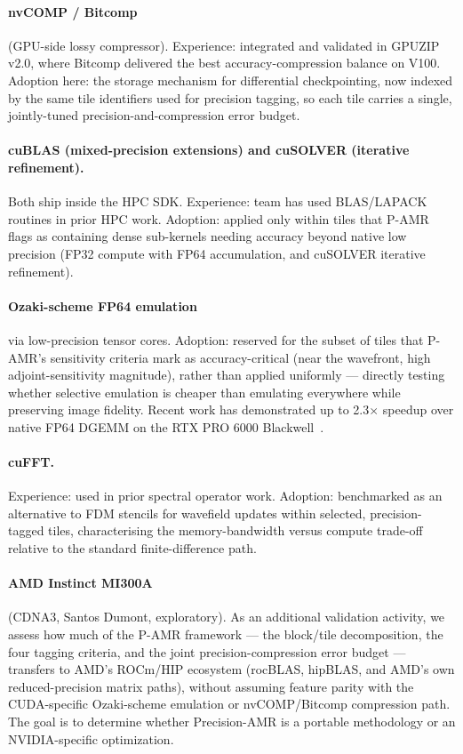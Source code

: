 \documentclass[12pt,a4paper]{article}
\newcommand{\pamr}{P\nobreakdash-AMR}
\begin{document}
\paragraph{nvCOMP / Bitcomp} (GPU-side lossy compressor). Experience: integrated
and validated in GPUZIP v2.0, where Bitcomp delivered the best
accuracy-compression balance on V100. Adoption here: the storage mechanism for
differential checkpointing, now indexed by the same tile identifiers used for
precision tagging, so each tile carries a single, jointly-tuned
precision-and-compression error budget.

\paragraph{cuBLAS (mixed-precision extensions) and cuSOLVER (iterative
refinement).} Both ship inside the HPC SDK. Experience: team has used
BLAS/LAPACK routines in prior HPC work. Adoption: applied only within tiles that
\pamr{} flags as containing dense sub-kernels needing accuracy beyond native low
precision (FP32 compute with FP64 accumulation, and cuSOLVER iterative
refinement).

\paragraph{Ozaki-scheme FP64 emulation} via low-precision tensor cores.
Adoption: reserved for the subset of tiles that \pamr{}'s sensitivity criteria
mark as accuracy-critical (near the wavefront, high adjoint-sensitivity
magnitude), rather than applied uniformly --- directly testing whether selective
emulation is cheaper than emulating everywhere while preserving image fidelity.
Recent work has demonstrated up to 2.3$\times$ speedup over native FP64 DGEMM on
the RTX PRO 6000 Blackwell~\cite{uchino2025ozaki}.

\paragraph{cuFFT.} Experience: used in prior spectral operator work. Adoption:
benchmarked as an alternative to FDM stencils for wavefield updates within
selected, precision-tagged tiles, characterising the memory-bandwidth versus
compute trade-off relative to the standard finite-difference path.

\paragraph{AMD Instinct MI300A} (CDNA3, Santos Dumont, exploratory). As an
additional validation activity, we assess how much of the \pamr{} framework ---
the block/tile decomposition, the four tagging criteria, and the joint
precision-compression error budget --- transfers to AMD's ROCm/HIP ecosystem
(rocBLAS, hipBLAS, and AMD's own reduced-precision matrix paths), without
assuming feature parity with the CUDA-specific Ozaki-scheme emulation or
nvCOMP/Bitcomp compression path. The goal is to determine whether Precision-AMR
is a portable methodology or an NVIDIA-specific optimization.
\end{document}
